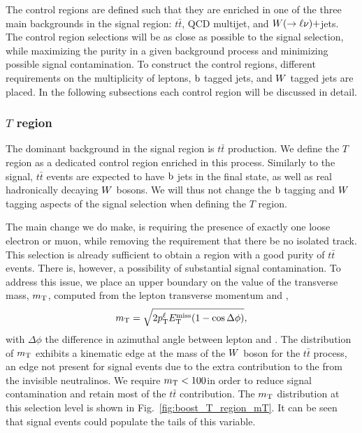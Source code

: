 
The control regions are defined such that they are enriched in one of the three main backgrounds in
the signal region: $t\bar{t}$, QCD multijet, and $W(\rightarrow \ell \nu)+$jets. The control
region
selections will be as close as possible to the signal selection, while maximizing the purity in a
given background process and minimizing possible signal contamination. 
To construct the control regions, different requirements on the 
multiplicity of leptons, $\mathrm{b}$ tagged jets, and $W$ tagged jets are placed. 
In the following subsections each control region will be discussed in detail. 

\subsubsection{\texorpdfstring{$T$}{T} region \label{sec:boost_T_region}}

The dominant background in the signal region is $t\bar{t}$ production. We define the $T$ region as a
dedicated control region enriched in this process. 
Similarly to the signal, $t\bar{t}$ events are expected to have $\mathrm{b}$ jets in the final state, as
well as real hadronically decaying $W$ bosons. We will thus not change the $\mathrm{b}$ tagging and
$W$ tagging aspects of the signal selection when defining the $T$ region. 

The main change we do make, is requiring the presence of exactly one loose electron or muon, while
removing the requirement that there be no isolated track. This selection is already sufficient to
obtain a region with a good purity of $t\bar{t}$ events. There is, however, a possibility of
substantial signal contamination. To address this issue, we place an upper boundary on the value of
the transverse mass, $m_{\mathrm{T}}$, computed from the lepton transverse momentum and \VEtmiss, 
\begin{equation}
 m_{\mathrm{T}} = \sqrt{2p_{\mathrm{T}}^\ell E_{\mathrm{T}}^{\text{miss}} ( 1 - \cos\Delta\phi )},
\end{equation}
with $\Delta\phi$ the difference in azimuthal angle between lepton and \VEtmiss. 
The distribution of $m_{\mathrm{T}}$ exhibits a kinematic edge at the mass of the $W$ boson for the $t\bar{t}$
process, an edge not present for signal events due to the extra contribution to the \ETm from the
invisible neutralinos.  We require $m_{\mathrm{T}} < 100$\GeV in order to reduce signal contamination and
retain most of the $t\bar{t}$ contribution. The $m_{\mathrm{T}}$ distribution at this selection level is shown
in Fig.~\ref{fig:boost_T_region_mT}. It can be seen that signal events could populate the tails of
this variable.


